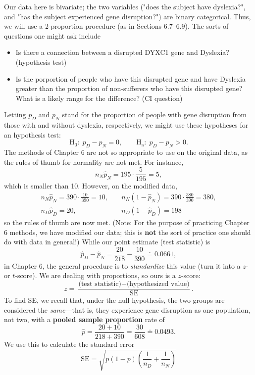 \documentclass{article}
\def\ds#1{\displaystyle{#1}}
\begin{document}
\begin{enumerate}
Our data here is bivariate; the two variables ("does the
subject have dyslexia?", and "has the subject experienced
gene disruption?") are binary categorical.  Thus, we will use
a 2-proportion procedure (as in Sections 6.7--6.9).  The sorts
of questions one might ask include
\begin{itemize}
\item
  Is there a connection between a disrupted DYXC1 gene
  and Dyslexia? (hypothesis test)
\item
  Is the porportion of people who have this disrupted
  gene and have Dyslexia greater than the proportion of
  non-sufferers who have this disrupted gene?  What is
  a likely range for the difference?  (CI question)
\end{itemize}
Letting $p_D$ and $p_N$ stand for the proportion of people
with gene disruption from those with and without dyslexia,
respectively, we might use these hypotheses for an hypothesis
test:
$$ \mathrm{H_0}\colon\; p_D - p_N = 0, \qquad
  \mathrm{H_a}\colon\; p_D - p_N > 0. $$
The methods of Chapter 6 are not so appropriate to use on
the original data, as the rules of thumb for normality are
not met.  For instance,
$$ n_N \hat p_N = 195\cdot\frac{5}{195} = 5, $$
which is smaller than 10.  However, on the modified data,
$$ \begin{array}{lcl} n_N \hat p_N = 390\cdot\ds{\frac{10}{390}}
 = 10, & \; & n_N(1-\hat p_N) = 390\cdot\ds{\frac{380}{390}}
 = 380, \\[6pt]
 n_D \hat p_D = 20, & & n_D(1-\hat p_D) = 198 \end{array} $$
so the rules of thumb are now met.  (Note: For the purpose of
practicing Chapter 6 methods, we have modified our data; this
is \textbf{not} the sort of practice one should do with data
in general!)
While our point estimate (test statistic) is
$$ \hat p_D - \hat p_N = \frac{20}{218} - \frac{10}{390}
  \doteq 0.0661, $$
in Chapter 6, the general procedure is to \textit{standardize}
this value (turn it into a $z$- or $t$-score).  We are dealing
with proportions, so ours is a $z$-score:
$$ z = \frac{\mbox{(test statistic)}
 - \mbox{(hypothesized value)}}{\mbox{SE}}. $$
To find SE, we recall that, under the null hypothesis, the
two groups are considered the \textit{same}---that is, they
experience gene disruption as one population, not two, with
a \textbf{pooled sample proportion} rate of
$$ \hat p = \frac{20 + 10}{218 + 390} = \frac{30}{608}
 \doteq 0.0493. $$
We use this to calculate the standard error
$$ \mbox{SE} = \sqrt{p(1-p)\left(\frac{1}{n_D}
 + \frac{1}{n_N}\right)} $$


\end{enumerate}
\end{document}

